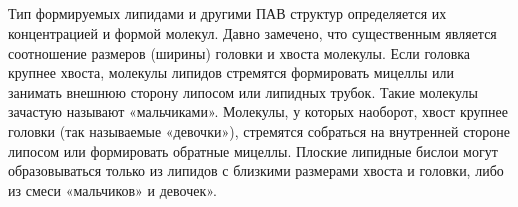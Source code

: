 \documentclass[a4paper,12pt]{article} %
\begin{document}
\subsection*{}
Тип формируемых липидами и другими ПАВ структур определяется их концентрацией и формой молекул. Давно замечено, что существенным является соотношение размеров (ширины) головки и хвоста молекулы. Если головка крупнее хвоста, молекулы липидов стремятся формировать мицеллы или занимать внешнюю сторону липосом или липидных трубок. Такие молекулы зачастую называют «мальчиками». Молекулы, у которых наоборот, хвост крупнее головки (так называемые «девочки»), стремятся собраться на внутренней стороне липосом или формировать обратные мицеллы. Плоские липидные бислои могут образовываться только из липидов с близкими размерами хвоста и головки, либо из смеси «мальчиков» и девочек». 
\end{document}
